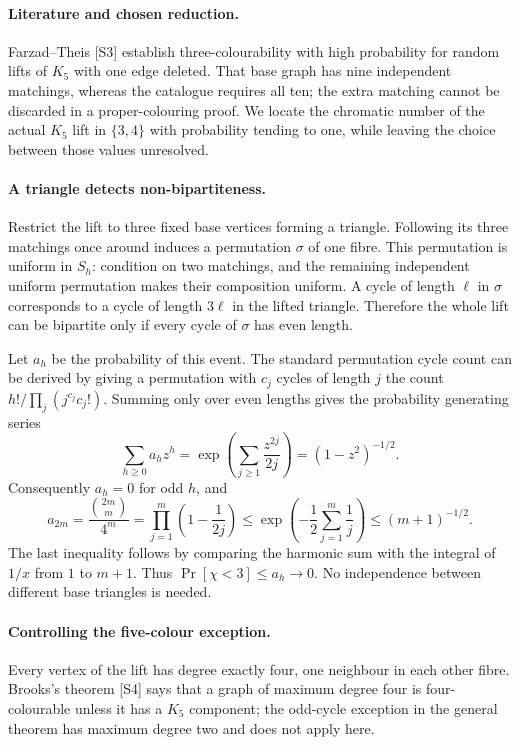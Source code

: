 \documentclass[11pt,a4paper]{article}
\begin{document}
\paragraph{Literature and chosen reduction.}
Farzad--Theis [S3] establish three-colourability with high probability for random lifts of $K_5$ with one edge deleted. That base graph has nine independent matchings, whereas the catalogue requires all ten; the extra matching cannot be discarded in a proper-colouring proof. We locate the chromatic number of the actual $K_5$ lift in $\{3,4\}$ with probability tending to one, while leaving the choice between those values unresolved.

\paragraph{A triangle detects non-bipartiteness.}
Restrict the lift to three fixed base vertices forming a triangle. Following its three matchings once around induces a permutation $\sigma$ of one fibre. This permutation is uniform in $S_h$: condition on two matchings, and the remaining independent uniform permutation makes their composition uniform. A cycle of length $\ell$ in $\sigma$ corresponds to a cycle of length $3\ell$ in the lifted triangle. Therefore the whole lift can be bipartite only if every cycle of $\sigma$ has even length.

Let $a_h$ be the probability of this event. The standard permutation cycle count can be derived by giving a permutation with $c_j$ cycles of length $j$ the count $h!/\prod_j(j^{c_j}c_j!)$. Summing only over even lengths gives the probability generating series
\[
 \sum_{h\ge0}a_hz^h
 =\exp\left(\sum_{j\ge1}\frac{z^{2j}}{2j}\right)
 =(1-z^2)^{-1/2}.
\]
Consequently $a_h=0$ for odd $h$, and
\[
 a_{2m}=\frac{\binom{2m}{m}}{4^m}
 =\prod_{j=1}^m\left(1-\frac1{2j}\right)
 \le\exp\left(-\frac12\sum_{j=1}^m\frac1j\right)
 \le(m+1)^{-1/2}.
\]
The last inequality follows by comparing the harmonic sum with the integral of $1/x$ from $1$ to $m+1$. Thus $\Pr[\chi<3]\le a_h\to0$. No independence between different base triangles is needed.

\paragraph{Controlling the five-colour exception.}
Every vertex of the lift has degree exactly four, one neighbour in each other fibre. Brooks's theorem [S4] says that a graph of maximum degree four is four-colourable unless it has a $K_5$ component; the odd-cycle exception in the general theorem has maximum degree two and does not apply here.
\end{document}
